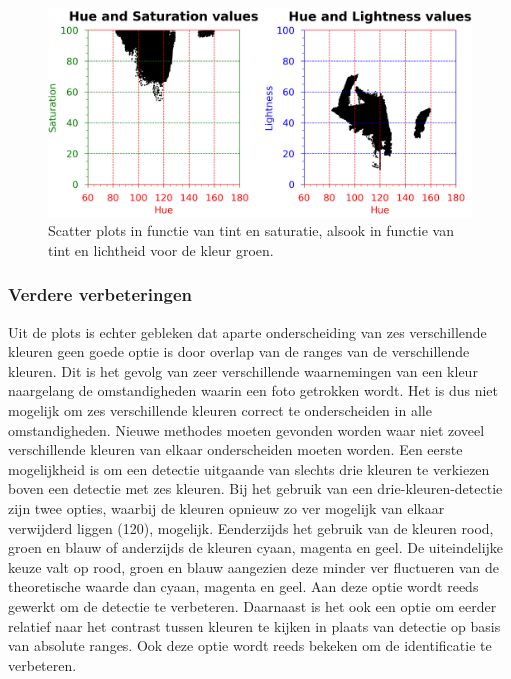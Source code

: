 \begin{figure}[h!]
	\center
	\includegraphics[width=\textwidth]{img/hslGreen.png}
	\caption{Scatter plots in functie van tint en saturatie, alsook in functie van tint en lichtheid voor de kleur groen.}
	\label{hslGreenPlot}
\end{figure}

\subsubsection{Verdere verbeteringen} \label{Verbeteringen kleur}
Uit de plots is echter gebleken dat aparte onderscheiding van zes verschillende kleuren geen goede optie is door overlap van de ranges van de verschillende kleuren. Dit is het gevolg van zeer verschillende waarnemingen van een kleur naargelang de omstandigheden waarin een foto getrokken wordt. Het is dus niet mogelijk om zes verschillende kleuren correct te onderscheiden in alle omstandigheden. Nieuwe methodes moeten gevonden worden waar niet zoveel verschillende kleuren van elkaar onderscheiden moeten worden. Een eerste mogelijkheid is om een detectie uitgaande van slechts drie kleuren te verkiezen boven een detectie met zes kleuren. Bij het gebruik van een drie-kleuren-detectie zijn twee opties, waarbij de kleuren opnieuw zo ver mogelijk van elkaar verwijderd liggen (120\degree),  mogelijk. Eenderzijds het gebruik van de kleuren rood, groen en blauw of anderzijds de kleuren cyaan, magenta en geel. De uiteindelijke keuze valt op rood, groen en blauw aangezien deze minder ver fluctueren van de theoretische waarde dan cyaan, magenta en geel. Aan deze optie wordt reeds gewerkt om de detectie te verbeteren. Daarnaast is het ook een optie om eerder relatief naar het contrast tussen kleuren te kijken in plaats van detectie op basis van absolute ranges. Ook deze optie wordt reeds bekeken om de identificatie te verbeteren.

